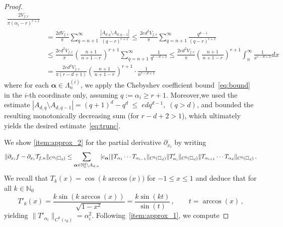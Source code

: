 \documentclass[10pt,a4paper]{amsart}
\DeclarePairedDelimiter{\norm}{\lVert}{\rVert}
\newcommand{\N}{\mathbb{N}}
\newcommand{\p}{\partial}
\begin{document}
\begin{proof}
\begin{align}
\frac{2V_{f,r}}{ \pi (\alpha_i-r)^{r+1}}\nonumber\\
  &= \frac{2dV_{f,r}}{\pi}\sum_{q=n+1}^{\infty} \frac{ |A_{d,q}\setminus A_{d,q-1}|}{(q - r)^{r+1}}\leq \frac{2ed^2V_{f,r}}{\pi}\sum_{q=n+1}^{\infty} \frac{ q^{d-1}}{(q - r)^{r+1}}\nonumber\\
  & \leq \frac{2ed^2V_{f,r}}{\pi}\left(\frac{n+1}{\,n+1-r\,}\right)^{r+1} \sum_{q=n+1}^{\infty} \frac{1}{q^{r-d+2}}\leq\frac{2ed^2V_{f,r}}{\pi}\left(\frac{n+1}{\,n+1-r\,}\right)^{r+1}\int_{n}^{\infty}\frac{1}{x^{r-d+2}}dx\nonumber\\\nonumber
  &= \frac{2ed^2V_{f,r}}{\pi(r-d+1)}\left(\frac{n+1}{\,n+1-r\,}\right)^{r+1}\cdot \frac{1}{n^{r-d+1}}\label{eq:sum_bound}\,
\end{align}
where for each \( \boldsymbol{\alpha} \in \Lambda_n^{(i)} \), we apply the Chebyshev coefficient bound~\eqref{eq:bound} in the \( i \)-th coordinate only, assuming \( q:=\alpha_i \geq r + 1 \). Moreover,we used the estimate \( |A_{d,q} \setminus A_{d,q-1}|
= (q+1)^d - q^d
\;\le\; e d q^{d-1}, \; (q > d)\), and bounded the resulting monotonically decreasing sum (for \(r-d+2 >1\)), which ultimately yields the desired estimate~\eqref{eq:trunc}.







We show \ref{item:approx_2} for the partial derivative $\p_{x_i}$ by writing
\begin{equation*}
    \norm{\partial_{x_i}f-\partial_{x_i}\mathcal{T}_{f,n}}_{C^0(\square_d)}\leq \sum_{\boldsymbol{\alpha} \in \N_0^d \setminus A_{d,n}} |c_{\boldsymbol{\alpha}}|\norm{T_{\alpha_1}\cdots T_{\alpha_{i-1}}}_{C^0(\square_d)}\norm{T'_{\alpha_i}}_{C^0(\square_d)}\norm{T_{\alpha_{i+1}}\cdots T_{\alpha_d}}_{C^0(\square_d)}\,.
\end{equation*}
We recall that $T_{k}(x)=\cos{\left(k\arccos(x\right))}$ for $-1\leq x\leq 1$ and deduce
that for all $k \in \N_0$
\begin{equation}\label{eq.derivative}
T'_{k}(x)=\frac{k\sin{\left(k\arccos\left(x\right)\right)}}{\sqrt{1-x^{2}}} =\frac{k\sin{\left(kt\right)}}{\sin{\left(t\right)}}\,, \qquad t=\arccos(x)\,,
\end{equation}
yielding $\|T'_{\alpha_i}\|_{C^0(\square_d)}=\alpha_i^{2}$.
Following~\ref{item:approx_1}, we compute


\end{proof}
\end{document}
